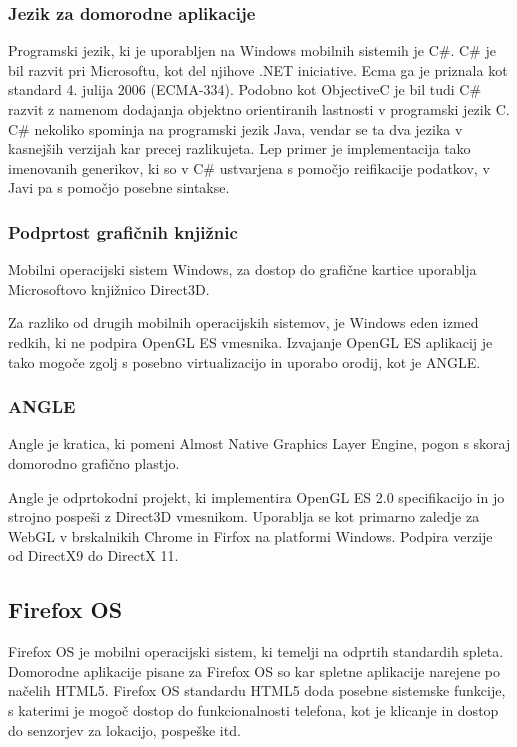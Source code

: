 \subsubsection{Jezik za domorodne aplikacije}

Programski jezik, ki je uporabljen na Windows mobilnih sistemih je C\#. C\# je bil razvit pri Microsoftu, kot del njihove .NET iniciative. Ecma ga je priznala kot standard 4. julija 2006 (ECMA-334). Podobno kot ObjectiveC je bil tudi C\# razvit z namenom dodajanja objektno orientiranih lastnosti v programski jezik C. C\# nekoliko spominja na programski jezik Java, vendar se ta dva jezika v kasnejših verzijah kar precej razlikujeta. Lep primer je implementacija tako imenovanih generikov, ki so v C\# ustvarjena s pomočjo reifikacije podatkov, v Javi pa s pomočjo posebne sintakse. 

\subsubsection{Podprtost grafičnih knjižnic}

Mobilni operacijski sistem Windows, za dostop do grafične kartice uporablja Microsoftovo knjižnico Direct3D. %

Za razliko od drugih mobilnih operacijskih sistemov, je Windows eden izmed redkih, ki ne podpira OpenGL ES vmesnika. Izvajanje OpenGL ES aplikacij je tako mogoče zgolj s posebno virtualizacijo in uporabo orodij, kot je ANGLE.

\subsubsection{ANGLE}
Angle \cite{angle} je kratica, ki pomeni Almost Native Graphics Layer Engine, pogon s skoraj domorodno grafično plastjo.

Angle je odprtokodni projekt, ki implementira OpenGL ES 2.0 specifikacijo in jo strojno pospeši z Direct3D vmesnikom. Uporablja se kot primarno zaledje za WebGL v brskalnikih Chrome in Firfox na platformi Windows. Podpira verzije od DirectX9 do DirectX 11.  

\subsection{Firefox OS}

Firefox OS \cite{firefoxos} je mobilni operacijski sistem, ki temelji na odprtih standardih spleta. Domorodne aplikacije pisane za Firefox OS so kar spletne aplikacije narejene po načelih HTML5. Firefox OS standardu HTML5 doda posebne sistemske funkcije, s katerimi je mogoč dostop do funkcionalnosti telefona, kot je klicanje in dostop do senzorjev za lokacijo, pospeške itd.

